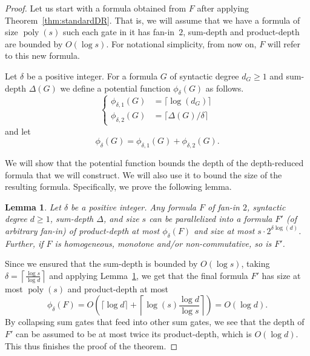 \documentclass[11pt,a4paper]{article}
\newtheorem{lemma}[theorem]{Lemma}
\newcommand{\poly}{\mathop{\mathrm{poly}}}
\begin{document}
\begin{proof}
	Let us start with a formula obtained from $F$ after applying Theorem~\ref{thm:standardDR}. That is, we will assume that we have a formula of size $\poly(s)$ such each gate in it has fan-in~$2$, sum-depth and product-depth are bounded by $O(\log s)$. For notational simplicity, from now on, $F$ will refer to this new formula.
	
	
	
	
	Let \(\delta\) be a positive integer. For a formula $G$ of syntactic degree $d_G \geq 1$ and sum-depth $\Delta(G)$ we define a potential function $\phi_\delta(G)$ as follows.
	\begin{equation*}
		\left\{\begin{aligned}
			\phi_{\delta,1} (G) & = \lceil \log(d_G) \rceil \\
			\phi_{\delta,2} (G) & =  \lceil \Delta(G) / \delta \rceil
		\end{aligned}\right.
	\end{equation*}
	and let $$\phi_{\delta}(G)= \phi_{\delta,1} (G) + \phi_{\delta,2} (G).$$
	
	We will show that the potential function bounds the depth of the depth-reduced formula that we will construct. We will also use it to bound the size of the resulting formula. Specifically, we prove the following lemma. 
	
	\begin{lemma}
		\label{lem:main-lemma}
		Let \(\delta\) be a positive integer.
		Any formula $F$ of fan-in \(2\), syntactic degree $d \geq 1$, sum-depth $\Delta$, and size \(s\) can be parallelized into a formula $F'$ (of arbitrary fan-in) of product-depth at most \(\phi_{\delta}(F)\)  and size at most
		\(s\cdot 2^{\delta \log(d)}\).
		Further, if $F$ is homogeneous, monotone and/or non-commutative, so is $F'$.
	\end{lemma}
	
	Since we ensured that the sum-depth is bounded by \(O(\log s)\), taking
	\(\delta=\left\lceil \frac{\log s}{\log d} \right\rceil \)
	and applying Lemma~\ref{lem:main-lemma}, we get that the final formula $F'$ has size at most \(\poly(s)\) and product-depth at most 
	\[
	\phi_{\delta}(F) = O\left( \lceil \log d \rceil+ \left\lceil \log(s) \frac{\log d}{\log s} \right\rceil \right) =  O(\log d).
	\]
	By collapsing sum gates that feed into other sum gates, we see that the depth of $F'$ can be assumed to be at most twice its product-depth, which is $O(\log d)$. This thus finishes the proof of the theorem. \end{proof}
\end{document}
